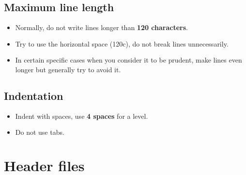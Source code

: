 \documentclass[a4paper,twoside,15pt]{book}
\begin{document}
            \subsection{Maximum line length}
                \begin{itemize}
                    \item Normally, do not write lines longer than \textbf{120 characters}.
                    \item Try to use the horizontal space (120c), do not break lines unnecessarily.
                    \item In certain specific cases when you consider it to be prudent, make lines even longer but generally try to avoid it.
                \end{itemize}

            \subsection{Indentation}
                \begin{itemize}
                    \item Indent with spaces, use \textbf{4 spaces} for a level.
                    \item Do not use tabs.
                \end{itemize}

    \section{Header files}
\end{document}
